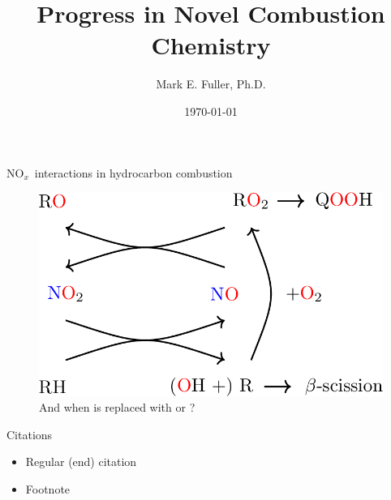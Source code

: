 \documentclass[10pt,presentation]{beamer}
\title{Progress in \soutthick{ Nitrogen } Novel Combustion Chemistry}
\author{Mark E. Fuller, Ph.D.}
\institute{Physico-Chemical Fundamentals of Combustion}
\date{\today}
\newcommand{\nox}{NO$_x$} %
\begin{document}
    
\begin{frame}{\nox\ interactions in hydrocarbon combustion}
    \begin{figure}
        \centering
        \includegraphics[width=0.8\linewidth]{../figures/NOx_Cycle.png}
        \caption{And when  is replaced with  or ?}
        \label{fig:NOx_cycle}
    \end{figure}
\end{frame}


\begin{frame}{Citations}
    \begin{itemize}
        \item Regular (end) citation\cite{Fuller.2014}
        \item Footnote
    \end{itemize}
\end{frame}
\end{document}
